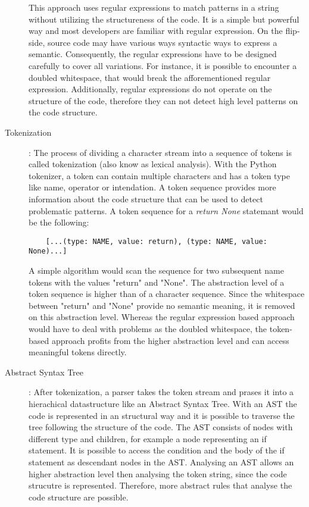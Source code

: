 \begin{description}
    This approach uses  regular expressions to match patterns in a string without utilizing the structureness of the code. It is a simple but powerful way and most developers are familiar with regular expression. On the flip-side, source code may have various ways syntactic ways to express a semantic. Consequently, the regular expressions have to be designed carefully to cover all variations. For instance, it is possible to encounter a doubled whitespace, that would break the afforementioned regular expression. Additionally, regular expressions do not operate on the structure of the code, therefore they can not detect high level patterns on the code structure.
    \item[Tokenization]: The process of dividing a character stream into a sequence of tokens is called tokenization (also know as lexical analysis). With the Python tokenizer, a token can contain multiple characters and has a token type like name, operator or intendation. A token sequence provides more information about the code structure that can be used to detect problematic patterns. 
    A token sequence for a \textit{return None} statemant would be the following: 
    \begin{lstlisting}
    [...(type: NAME, value: return), (type: NAME, value: None)...]
    \end{lstlisting}
    A simple algorithm would scan the sequence for two subsequent name tokens with the values "return" and "None". The abstraction level of a token sequence is higher than of a character sequence. Since the whitespace between "return" and "None" provide no semantic meaning, it is removed on this abstraction level. Whereas the regular expression based approach would have to deal with problems as the doubled whitespace, the token-based approach profits from the higher abstraction level and can access meaningful tokens directly.
    \item[Abstract Syntax Tree]: After tokenization, a parser takes the token stream and prases it into a hierachical datastructure like an Abstract Syntax Tree. With an AST the code is represented in an structural way and it is possible to traverse the tree following the structure of the code. The AST consists of nodes with different type and children, for example a node representing an if statement. It is possible to access the condition and the body of the if statement as descendant nodes in the AST. Analysing an AST allows an higher abstraction level then analysing the token string, since the  code strucutre is represented. Therefore, more abstract rules that analyse the code structure are possible.


\end{description}
